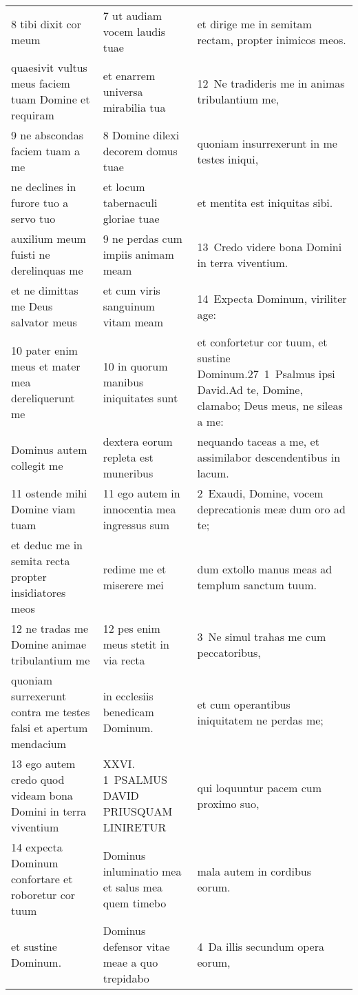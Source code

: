 \documentclass{article}
\begin{document}
\begin{longtable}{@{}p{}p{}p{}@{}}
8 tibi dixit cor meum	&	7 ut audiam vocem laudis tuae	&	et dirige me in semitam rectam, propter inimicos meos.	\\
quaesivit vultus meus faciem tuam Domine et requiram	&	et enarrem universa mirabilia tua	&	12 Ne tradideris me in animas tribulantium me,	\\
9 ne abscondas faciem tuam a me	&	8 Domine dilexi decorem domus tuae	&	quoniam insurrexerunt in me testes iniqui,	\\
ne declines in furore tuo a servo tuo	&	et locum tabernaculi gloriae tuae	&	et mentita est iniquitas sibi.	\\
auxilium meum fuisti ne derelinquas me	&	9 ne perdas cum impiis animam meam	&	13 Credo videre bona Domini in terra viventium.	\\
et ne dimittas me Deus salvator meus	&	et cum viris sanguinum vitam meam	&	14 Expecta Dominum, viriliter age:	\\
10 pater enim meus et mater mea dereliquerunt me	&	10 in quorum manibus iniquitates sunt	&	et confortetur cor tuum, et sustine Dominum.27 1 Psalmus ipsi David.Ad te, Domine, clamabo; Deus meus, ne sileas a me:	\\
Dominus autem collegit me	&	dextera eorum repleta est muneribus	&	nequando taceas a me, et assimilabor descendentibus in lacum.	\\
11 ostende mihi Domine viam tuam	&	11 ego autem in innocentia mea ingressus sum	&	2 Exaudi, Domine, vocem deprecationis meæ dum oro ad te;	\\
et deduc me in semita recta propter insidiatores meos	&	redime me et miserere mei	&	dum extollo manus meas ad templum sanctum tuum.	\\
12 ne tradas me Domine animae tribulantium me	&	12 pes enim meus stetit in via recta	&	3 Ne simul trahas me cum peccatoribus,	\\
quoniam surrexerunt contra me testes falsi et apertum mendacium	&	in ecclesiis benedicam Dominum.	&	et cum operantibus iniquitatem ne perdas me;	\\
13 ego autem credo quod videam bona Domini in terra viventium	&	XXVI. 1 PSALMUS DAVID PRIUSQUAM LINIRETUR	&	qui loquuntur pacem cum proximo suo,	\\
14 expecta Dominum confortare et roboretur cor tuum	&	Dominus inluminatio mea et salus mea quem timebo	&	mala autem in cordibus eorum.	\\
et sustine Dominum.	&	Dominus defensor vitae meae a quo trepidabo	&	4 Da illis secundum opera eorum,	\\

\end{longtable}
\end{document}
